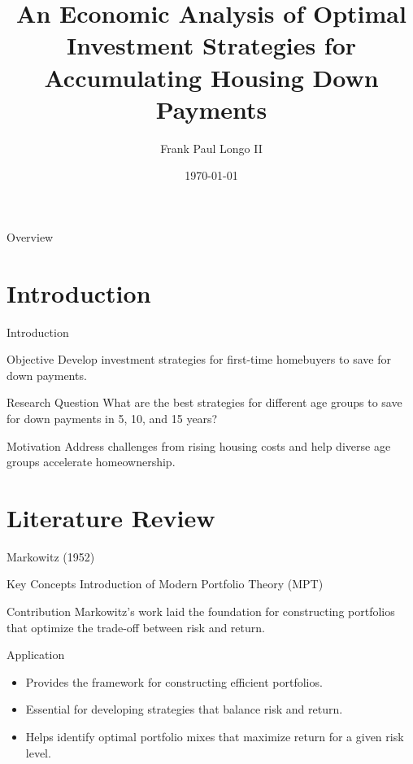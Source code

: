 \documentclass{beamer}
\title{An Economic Analysis of Optimal Investment Strategies for Accumulating Housing Down Payments}
\author{Frank Paul Longo II}
\date{\today}
\begin{document}
\begin{frame}
    \titlepage
\end{frame}

\begin{frame}{Overview}
    \tableofcontents
\end{frame}

\section{Introduction}
\begin{frame}{Introduction}
    \begin{block}{Objective}
        Develop investment strategies for first-time homebuyers to save for down payments.
    \end{block}
    \begin{block}{Research Question}
        What are the best strategies for different age groups to save for down payments in 5, 10, and 15 years?
    \end{block}
    \begin{block}{Motivation}
        Address challenges from rising housing costs and help diverse age groups accelerate homeownership.
    \end{block}
\end{frame}



\section{Literature Review}
\begin{frame}{Markowitz (1952)}
    \begin{block}{Key Concepts}
        Introduction of Modern Portfolio Theory (MPT)
    \end{block}
    \begin{block}{Contribution}
        Markowitz's work laid the foundation for constructing portfolios that optimize the trade-off between risk and return.
    \end{block}
    \begin{block}{Application}
        \begin{itemize}
            \item Provides the framework for constructing efficient portfolios.
            \item Essential for developing strategies that balance risk and return.
            \item Helps identify optimal portfolio mixes that maximize return for a given risk level.
        \end{itemize}
    \end{block}
\end{frame}
\end{document}
